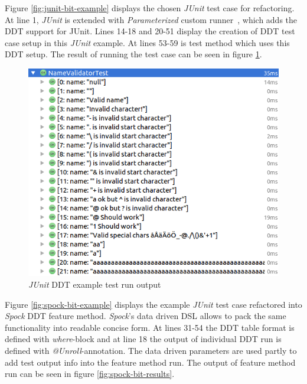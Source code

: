    \restoregeometry

    Figure \ref{fig:junit-bit-example} displays the chosen \textit{JUnit} test case for refactoring. At line 1, \textit{JUnit} is extended with
    \textit{Parameterized} custom runner~\cite{junit-parameterized}, which adds the DDT support for JUnit.
    Lines 14-18 and 20-51 display the creation
    of DDT test case setup in this \textit{JUnit} example. At lines 53-59 is test method which uses this DDT setup. The result of running
    the test case can be seen in figure \ref{fig:junit-bit-results}.

    \begin{figure}[H]
      \begin{center}
        \begin{topbot}[style=mdstyle]
        \includegraphics[width=\textwidth]{images/junit-validator-results.png}
        \end{topbot}
        \caption{\textit{JUnit} DDT example test run output}
        \label{fig:junit-bit-results}
      \end{center}
    \end{figure}

    Figure \ref{fig:spock-bit-example} displays the example \textit{JUnit} test case refactored into \textit{Spock} DDT feature method. \textit{Spock}'s
    data driven DSL allows to pack the same functionality into readable concise form.  At lines 31-54 the DDT table format
    is defined with \textit{where}-block and at line 18 the output of individual DDT run is defined with \textit{@Unroll}-annotation.
    The data driven parameters are used partly
    to add test output info into the feature method run. The output of feature method run can
    be seen in figure \ref{fig:spock-bit-results}.

